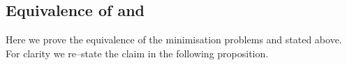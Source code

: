 


\subsection{Equivalence of  and }
\label{sec:equivalence-proof}

Here we prove the equivalence of the minimisation problems
 and  stated above. For
clarity we re--state the claim in the following proposition.

